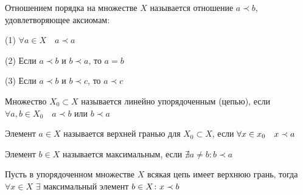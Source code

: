 \documentclass[a4paper,12pt]{report}
\newcommand*{\hm}[1]{#1\nobreak\discretionary{}%
            {\hbox{$\mathsurround=0pt #1$}}{}}
\begin{document}
\begin{df} Отношением порядка на множестве $X$ называется отношение $a\prec b$, удовлетворяющее аксиомам:

(1) $\forall a\in X\quad a\prec a$

(2) Если $a\prec b$ и $b\prec a$, то $a=b$

(3) Если $a\prec b$ и $b\prec c$, то $a\prec c$

Множество $X_0\subset X$ называется линейно упорядоченным (цепью), если $\forall a,b\in X_0\quad a\prec b$ или $b\prec a$

Элемент $a\in X$ называется верхней гранью для $X_0\subset X$, если $\forall x\hm\in x_0\quad x\prec a$

Элемент $b\in X$ называется максимальным, если $\nexists a\ne b\colon b\prec a$
\end{df}
 


\begin{aks} Пусть в упорядоченном множестве $X$ всякая цепь имеет верхнюю грань, тогда $\forall x\in X$ $\exists$ максимальный элемент $b\hm\in X\colon x\prec b$
\end{aks}
 
\end{document}
